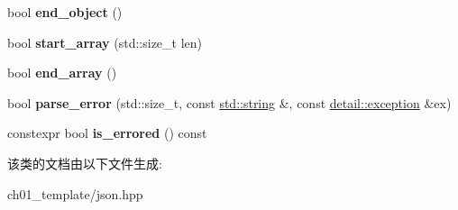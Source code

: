\begin{DoxyCompactItemize}
\mbox{\label{classnlohmann_1_1detail_1_1json__sax__dom__callback__parser_ae75d313d6d1b9c29508e740a10fefa18}} 
bool {\bfseries end\+\_\+object} ()
\item 
\mbox{\label{classnlohmann_1_1detail_1_1json__sax__dom__callback__parser_a5255b98ba8282e3625968f91cff9d3d0}} 
bool {\bfseries start\+\_\+array} (std\+::size\+\_\+t len)
\item 
\mbox{\label{classnlohmann_1_1detail_1_1json__sax__dom__callback__parser_aa64e7a650952174037d32028de582c12}} 
bool {\bfseries end\+\_\+array} ()
\item 
\mbox{\label{classnlohmann_1_1detail_1_1json__sax__dom__callback__parser_aac6e64f0b59c9150cde974e182d5ecab}} 
bool {\bfseries parse\+\_\+error} (std\+::size\+\_\+t, const \mbox{\hyperlink{namespacenlohmann_1_1detail_a1ed8fc6239da25abcaf681d30ace4985ab45cffe084dd3d20d928bee85e7b0f21}{std\+::string}} \&, const \mbox{\hyperlink{classnlohmann_1_1detail_1_1exception}{detail\+::exception}} \&ex)
\item 
\mbox{\label{classnlohmann_1_1detail_1_1json__sax__dom__callback__parser_a167fd9bf385d3d08bcbbba8a927c0eff}} 
constexpr bool {\bfseries is\+\_\+errored} () const
\end{DoxyCompactItemize}


该类的文档由以下文件生成\+:\begin{DoxyCompactItemize}
\item 
ch01\+\_\+template/json.\+hpp\end{DoxyCompactItemize}
